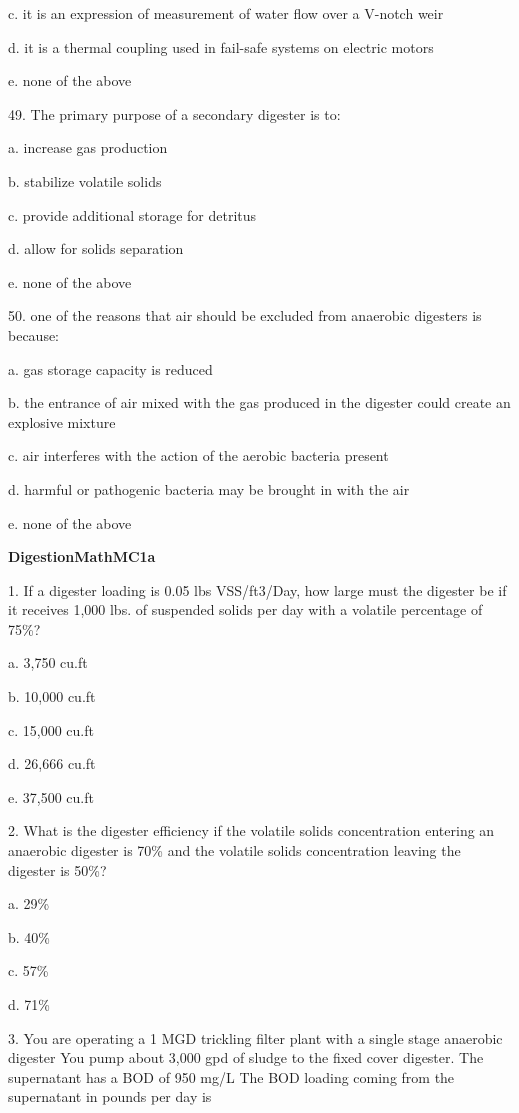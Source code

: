 \documentclass{article}
\begin{document}
c. it is an expression of measurement of water flow over a V-notch weir 

d. it is a thermal coupling used in fail-safe systems on electric motors 

e. none of the above 


49. The primary purpose of a secondary digester is to: 

a. increase gas production 

b. stabilize volatile solids 

c. provide additional storage for detritus 

d. allow for solids separation 

e. none of the above 


50. one of the reasons that air should be excluded from anaerobic digesters is because: 

a. gas storage capacity is reduced 

b. the entrance of air mixed with the gas produced in the digester could create an explosive mixture 

c. air interferes with the action of the aerobic bacteria present 

d. harmful or pathogenic bacteria may be brought in with the air 

e. none of the above 


\textbf{DigestionMathMC1a}

1. If a digester loading is 0.05 lbs VSS/ft3/Day, how large must the digester be if it receives 1,000 lbs. of suspended solids per day with a volatile percentage of 75\%? 

a. 3,750 cu.ft 

b. 10,000 cu.ft 

c. 15,000 cu.ft 

d. 26,666 cu.ft 

e. 37,500 cu.ft 


2. What is the digester efficiency if the volatile solids concentration entering an anaerobic digester is 70\% and the volatile solids concentration leaving the digester is 50\%? 

a. 29\% 

b. 40\% 

c. 57\% 

d. 71\% 


3. You are operating a 1 MGD trickling filter plant with a single stage anaerobic digester You pump about 3,000 gpd of sludge to the fixed cover digester.  The supernatant has a BOD of 950 mg/L The BOD loading coming from the supernatant in pounds per day is 
\end{document}

